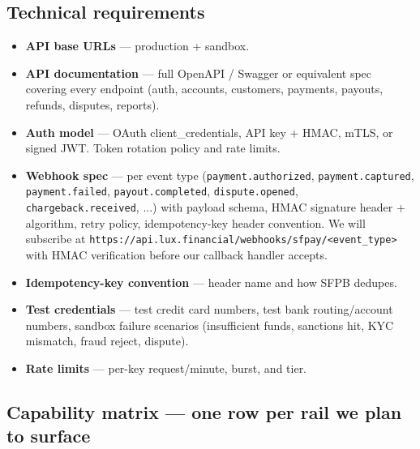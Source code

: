 \documentclass[11pt,letterpaper]{article}
\begin{document}
\subsection{Technical requirements}
\begin{itemize}[leftmargin=1.6em]
  \item \textbf{API base URLs} --- production + sandbox.
  \item \textbf{API documentation} --- full OpenAPI / Swagger or
        equivalent spec covering every endpoint (auth, accounts,
        customers, payments, payouts, refunds, disputes, reports).
  \item \textbf{Auth model} --- OAuth client\_credentials, API key +
        HMAC, mTLS, or signed JWT. Token rotation policy and rate
        limits.
  \item \textbf{Webhook spec} --- per event type
        (\texttt{payment.authorized}, \texttt{payment.captured},
        \texttt{payment.failed}, \texttt{payout.completed},
        \texttt{dispute.opened}, \texttt{chargeback.received}, ...)
        with payload schema, HMAC signature header + algorithm, retry
        policy, idempotency-key header convention. We will subscribe at
        \texttt{https://api.lux.financial/webhooks/sfpay/<event\_type>}
        with HMAC verification before our callback handler accepts.
  \item \textbf{Idempotency-key convention} --- header name and how
        SFPB dedupes.
  \item \textbf{Test credentials} --- test credit card numbers, test
        bank routing/account numbers, sandbox failure scenarios
        (insufficient funds, sanctions hit, KYC mismatch, fraud
        reject, dispute).
  \item \textbf{Rate limits} --- per-key request/minute, burst, and
        tier.
\end{itemize}

\subsection{Capability matrix --- one row per rail we plan to surface}
\end{document}
